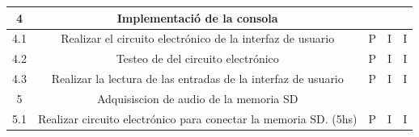 \documentclass[11pt]{charter}
\begin{document}
\begin{table}[]
\begin{tabular}{|c|c|c|c|c|}
\rowcolor[HTML]{CBCEFB} 
4                                                                                              & Implementació de la consola                                                        &                                                                             &                                                                    &                                                                      \\ \hline
4.1                                                                                            & Realizar el circuito electrónico de la interfaz de usuario                         & P                                                                           & I                                                                  & I                                                                    \\ \hline
4.2                                                                                            & Testeo de del circuito electrónico                                                 & P                                                                           & I                                                                  & I                                                                    \\ \hline
4.3                                                                                            & Realizar la lectura de las entradas de la interfaz de usuario                      & P                                                                           & I                                                                  & I                                                                    \\ \hline
\rowcolor[HTML]{CBCEFB} 
5                                                                                              & Adquisiscion de audio de la memoria SD                                             &                                                                             &                                                                    &                                                                      \\ \hline
5.1                                                                                            & Realizar circuito electrónico para conectar la memoria SD. (5hs)                   & P                                                                           & I                                                                  & I                                                                    \\ \hline

\end{tabular}
\end{table}
\end{document}
